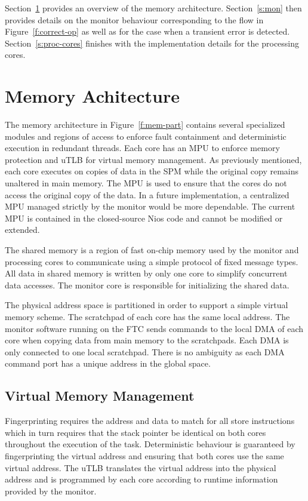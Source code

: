 
	Section~\ref{s:mem-arch} provides an overview of the memory architecture. 
	Section~\ref{s:mon} then provides details on the monitor behaviour corresponding to the flow in Figure~\ref{f:correct-op} as well as for the case when a transient error is detected.
	Section~\ref{s:proc-cores} finishes with the implementation details for the processing cores.

\section{Memory Achitecture}
\label{s:mem-arch}
	The memory architecture in Figure~\ref{f:mem-part} contains several specialized modules and regions of access to enforce fault containment and deterministic execution in redundant threads. 
	Each core has an MPU to enforce memory protection and uTLB for virtual memory management. 
	As previously mentioned, each core executes on copies of data in the SPM while the original copy remains unaltered in main memory. 
	The MPU is used to ensure that the cores do not access the original copy of the data. 
	In a future implementation, a centralized MPU managed strictly by the monitor would be more dependable. 
	The current MPU is contained in the closed-source Nios code and cannot be modified or extended. 

	The shared memory is a region of fast on-chip memory used by the monitor and processing cores to communicate using a simple protocol of fixed message types. 
	All data in shared memory is written by only one core to simplify concurrent data accesses. 
	The monitor core is responsible for initializing the shared data. %

	The physical address space is partitioned in order to support a simple virtual memory scheme. 
	The scratchpad of each core has the same local address. 
	The monitor software running on the FTC sends commands to the local DMA of each core when copying data from main memory to the scratchpads. 
	Each DMA is only connected to one local scratchpad. 
	There is no ambiguity as each DMA command port has a unique address in the global space. 

\subsection{Virtual Memory Management}
\label{s:virt-mem}
	Fingerprinting requires the address and data to match for all store instructions which in turn requires that the stack pointer be identical on both cores throughout the execution of the task. 
	Deterministic behaviour is guaranteed by fingerprinting the virtual address and ensuring that both cores use the same virtual address. 
	The uTLB translates the virtual address into the physical address and is programmed by each core according to runtime information provided by the monitor. 		
	
